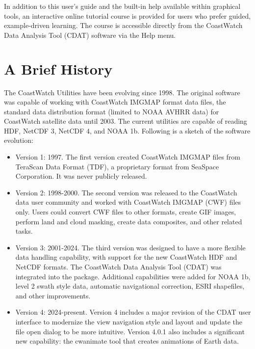 In addition to this user’s guide and the built-in help available within
graphical tools, an interactive online tutorial course is provided for
users who prefer guided, example-driven learning. The course is
accessible directly from the CoastWatch Data Analysis Tool (CDAT) software 
via the Help menu.

\section{A Brief History}

The CoastWatch Utilities have been evolving since 1998.  The original
software was capable of working with CoastWatch IMGMAP format data
files, the standard data distribution format (limited to NOAA AVHRR
data) for CoastWatch satellite data until 2003.  The current utilities
are capable of reading HDF, NetCDF 3, NetCDF 4, and NOAA 1b.  Following
is a sketch of the software evolution:
\begin{itemize}

  \item Version 1: 1997.  The first version created CoastWatch IMGMAP
  files from TeraScan Data Format (TDF), a proprietary format from
  SeaSpace Corporation.  It was never publicly released.

  \item Version 2: 1998-2000.  The second version was released to the
  CoastWatch data user community and worked with CoastWatch IMGMAP
  (CWF) files only.  Users could convert CWF files to other formats,
  create GIF images, perform land and cloud masking, create data
  composites, and other related tasks.  

  \item Version 3: 2001-2024.  The third version was designed to have
  a more flexible data handling capability, with support for the new
  CoastWatch HDF and NetCDF formats.  The CoastWatch
  Data Analysis Tool (CDAT) was integrated into the package.
  Additional capabilities were added for NOAA 1b, level 2 swath
  style data, automatic navigational correction, ESRI shapefiles, and
  other improvements.

  \item Version 4: 2024-present.  Version 4 includes a major revision
  of the CDAT user interface to modernize the view navigation style 
  and layout and update the file open dialog to be more intuitive.
  Version 4.0.1 also includes a significant new capability: the cwanimate
  tool that creates animations of Earth data.

\end{itemize}

